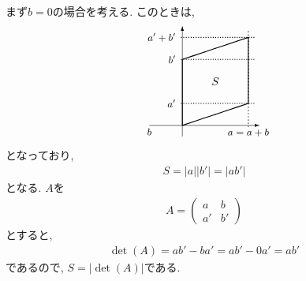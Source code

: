 \begin{remark}
  まず$b=0$の場合を考える.
  このときは,
  \begin{align*}
    \begin{picture}(100,100)
      \put(30,0){\vector(0,1){100}}
      \put(0,10){\vector(1,0){100}}
      \thicklines
      \put(30,10){\line(3,1){60}}
      \put(30,10){\line(0,1){60}}
      \put(90,90){\line(-3,-1){60}}
      \put(90,90){\line(0,-1){60}}
      \qbezier[30](90,9)(90,53)(90,95)
      \qbezier[30](29,30)(63,30)(95,30)
      \qbezier[30](29,70)(63,70)(95,70)
      \qbezier[30](29,90)(63,90)(95,90)
      \put(0,1){\makebox(0,0)[b]{\small $b$}}
      \put(90,0){\makebox(0,0)[b]{\small $a=a+b$}}
      \put(24,30){\makebox(0,0)[r]{\small $a'$}}
      \put(24,70){\makebox(0,0)[r]{\small $b'$}}
      \put(24,90){\makebox(0,0)[r]{\small $a'+b'$}}
      \put(60,50){\makebox(0,0){$S$}}
    \end{picture}
  \end{align*}
  となっており,
  \begin{align*}
    S=|a||b'|=|ab'|
  \end{align*}
  となる. $A$を
  \begin{align*}
    A=\begin{pmatrix}a&b\\a'&b'\end{pmatrix}
  \end{align*}
  とすると,
  \begin{align*}
    \det(A)=ab'-ba'=ab'-0a'=ab'
  \end{align*}
  であるので, $S=|\det(A)|$である.


\end{remark}

